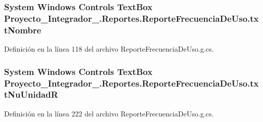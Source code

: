 \hypertarget{class_proyecto___integrador__3_1_1_reportes_1_1_reporte_frecuencia_de_uso_a801cfb9352eddd0840ad7203a734d5e8}{
\subsubsection[{txt\-Nombre}]{\setlength{\rightskip}{0pt plus 5cm}System Windows Controls Text\-Box Proyecto\-\_\-\-Integrador\-\_.\-Reportes.\-Reporte\-Frecuencia\-De\-Uso.\-txt\-Nombre\hspace{0.3cm}{\ttfamily [package]}}}\label{class_proyecto___integrador__3_1_1_reportes_1_1_reporte_frecuencia_de_uso_a801cfb9352eddd0840ad7203a734d5e8}


Definición en la línea 118 del archivo Reporte\-Frecuencia\-De\-Uso.\-g.\-cs.

\hypertarget{class_proyecto___integrador__3_1_1_reportes_1_1_reporte_frecuencia_de_uso_ad3104fe9d62ad8d1d810606d9b182b9c}{
\subsubsection[{txt\-Nu\-Unidad\-R}]{\setlength{\rightskip}{0pt plus 5cm}System Windows Controls Text\-Box Proyecto\-\_\-\-Integrador\-\_.\-Reportes.\-Reporte\-Frecuencia\-De\-Uso.\-txt\-Nu\-Unidad\-R\hspace{0.3cm}{\ttfamily [package]}}}\label{class_proyecto___integrador__3_1_1_reportes_1_1_reporte_frecuencia_de_uso_ad3104fe9d62ad8d1d810606d9b182b9c}


Definición en la línea 222 del archivo Reporte\-Frecuencia\-De\-Uso.\-g.\-cs.

